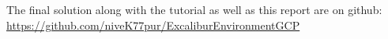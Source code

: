 The final solution along with the tutorial as well as this report are
on github: \url{https://github.com/niveK77pur/ExcaliburEnvironmentGCP}
